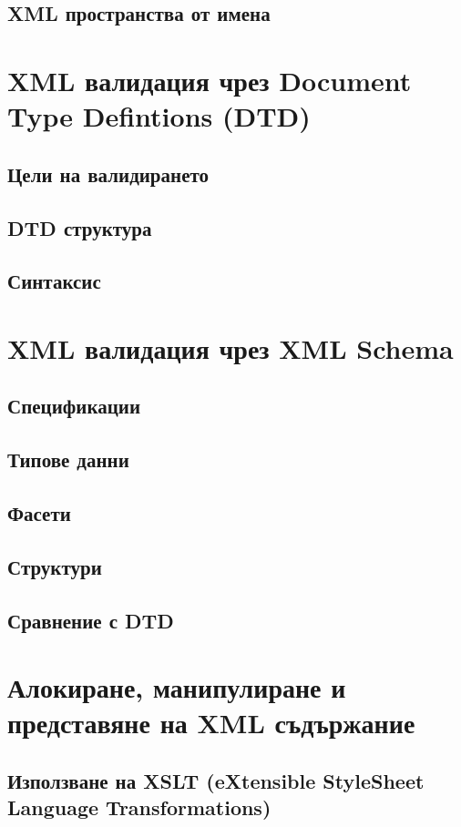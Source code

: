 \documentclass[fleqn,12pt]{article}
\begin{document}
\subsection{XML пространства от имена}

\section{XML валидация чрез Document Type Defintions (DTD)}

\subsection{Цели на валидирането}
\subsection{DTD структура}
\subsection{Синтаксис}

\section{XML валидация чрез XML Schema}

\subsection{Спецификации}
\subsection{Типове данни}
\subsection{Фасети}
\subsection{Структури}
\subsection{Сравнение с DTD}

\section{Алокиране, манипулиране и представяне на XML съдържание}

\subsection{Използване на XSLT (eXtensible StyleSheet Language Transformations)}
\end{document}

